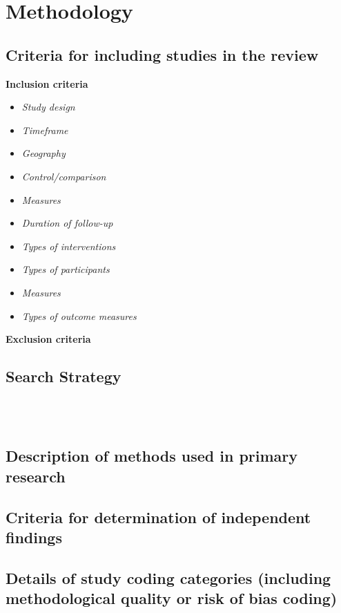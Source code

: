 \documentclass{article}
\begin{document}
\section*{Methodology}

\subsection*{Criteria for including studies in the review}

\noindent \textbf{Inclusion criteria} \\


\begin{itemize}
\item \emph{Study design}
\item \emph{Timeframe}
\item \emph{Geography}
\item \emph{Control/comparison}
\item \emph{Measures}
\item \emph{Duration of follow-up}
\item \emph{Types of interventions}
\item \emph{Types of participants}
\item \emph{Measures}
\item \emph{Types of outcome measures}
\end{itemize}


\noindent \textbf{Exclusion criteria} \\


\subsection*{Search Strategy}

\noindent \textbf{} \\
\noindent \textbf{} \\


\subsection*{Description of methods used in primary research}


\subsection*{Criteria for determination of independent findings}


\subsection*{Details of study coding categories (including methodological quality or risk of bias coding)}
\end{document}
